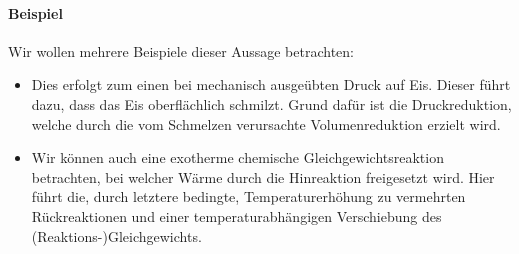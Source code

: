 \paragraph*{Beispiel} Wir wollen mehrere Beispiele dieser Aussage betrachten:
\begin{itemize}
	\item Dies erfolgt zum einen bei mechanisch ausgeübten Druck auf Eis. Dieser führt dazu, dass das Eis oberflächlich schmilzt. Grund dafür ist die Druckreduktion, welche durch die vom Schmelzen verursachte Volumenreduktion erzielt wird. 
	\item Wir können auch eine exotherme chemische Gleichgewichtsreaktion betrachten, bei welcher Wärme durch die Hinreaktion freigesetzt wird. Hier führt die, durch letztere bedingte, Temperaturerhöhung zu vermehrten Rückreaktionen und einer temperaturabhängigen Verschiebung des (Reaktions-)Gleichgewichts.
\end{itemize}
